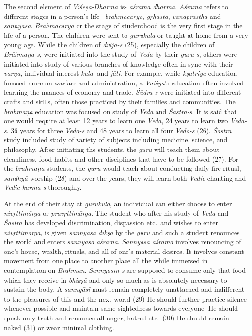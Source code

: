 The second element of \emph{Viśeṣa-Dharma} is- \emph{āśrama} \emph{dharma}. \emph{Āśrama} refers to different stages in a person's life --\emph{brahmacarya}, \emph{gṛhasta}, \emph{vānaprastha} and \emph{sannyāsa}. \emph{Brahmacarya} or the stage of studenthood is the very first stage in the life of a person. The children were sent to \emph{gurukula} or taught at home from a very young age. While the children of \emph{dvija-s} (25), especially the children of \emph{Brāhmaṇa-s}, were initiated into the study of \emph{Veda} by their \emph{guru-s}, others were initiated into study of various branches of knowledge often in sync with their \emph{varṇa}, individual interest \emph{kula}, and \emph{jāti}. For example, while \emph{kṣatriya} education focused more on warfare and administration, a \emph{Vaiśya}'s education often involved learning the nuances of economy and trade. \emph{Śūdra-s} were initiated into different crafts and skills, often those practiced by their families and communities. The \emph{brāhmaṇa} education was focused on study of \emph{Veda} and \emph{Śāstra-s}. It is said that one would require at least 12 years to learn one \emph{Veda}, 24 years to learn two \emph{Veda-s}, 36 years for three \emph{Veda-s} and 48 years to learn all four \emph{Veda-s} (26). \emph{Śāstra} study included study of variety of subjects including medicine, science, and philosophy. After initiating the students, the \emph{guru} will teach them about cleanliness, food habits and other disciplines that have to be followed (27). For the \emph{brāhmaṇa} students, the \emph{guru} would teach about conducting daily fire ritual, \emph{sandhyā}-worship (28) and over the years, they will learn both \emph{Vedic} chanting and \emph{Vedic} \emph{karma-s} thoroughly.

At the end of their stay at \emph{gurukula}, an individual can either choose to enter \emph{nivṛttimārga} or \emph{pravṛttimārga}. The student who after his study of \emph{Veda} and \emph{Śāstra} has developed discrimination, dispassion etc.\ and wishes to enter \emph{nivṛttimārga}, is given \emph{sannyāsa} \emph{dīkṣā} by the \emph{guru} and such a student renounces the world and enters \emph{sannyāsa} \emph{āśrama}. \emph{Sannyāsa} \emph{āśrama} involves renouncing of one's house, wealth, rituals, and all of one's material desires. It involves constant movement from one place to another place all the while immersed in contemplation on \emph{Brahman}. \emph{Sannyāsin-s} are supposed to consume only that food which they receive in \emph{bhikṣā} and only so much as is absolutely necessary to sustain the body. A \emph{sannyāsī} must remain completely unattached and indifferent to the pleasures of this and the next world (29) He should further practice silence whenever possible and maintain same sightedness towards everyone. He should speak only truth and renounce all anger, hatred etc.\ (30) He should remain naked (31) or wear minimal clothing.

